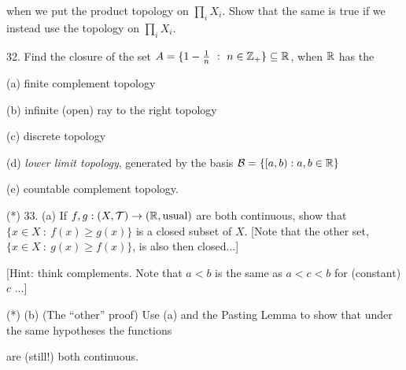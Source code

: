 \documentclass[12]{article}
\begin{document}
\begin{description}

\item{\spc} when we put the product topology on $\prod_i X_i$. Show that the same is 
true if we instead use the  topology on  $\prod_i X_i$.

\msk

\item{32.} Find the closure of the set $A = \{1-{{1}\over{n}}\ :\ n\in{\mathbb Z}_+\}\subseteq{\mathbb R}$, when ${\mathbb R}$ has the 

\msk

\item{\spc} (a) finite complement topology

\ssk

\item{\spc} (b) infinite (open) ray to the right topology

\ssk

\item{\spc} (c) discrete topology

\ssk

\item{\spc} (d) {\it lower limit topology}, generated by the basis ${{\mathcal B}} = \{[a,b) : a,b\in{\mathbb R}\}$

\ssk

\item{\spc} (e) countable complement topology.

\msk

\item{(*)} 33. (a) If $f,g:(X,{\mathcal T})\rightarrow ({\mathbb R},\textrm{usual})$ are both continuous, show that
$\{x\in X\ :\ f(x)\geq g(x)\}$ is a closed subset of $X$. [Note that the other set,
$\{x\in X\ :\ g(x)\geq f(x)\}$, is also then closed...]

\item{\spc} [Hint: think complements. Note that $a<b$ is the same as $a<c<b$ for 
(constant) $c$ ...]

\item{(*)} (b) (The ``other'' proof) 
Use (a) and the Pasting Lemma to show that under the same hypotheses the functions

\ssk


\ssk

\item{\spc} are (still!) both continuous.



\end{description}
\end{document}
